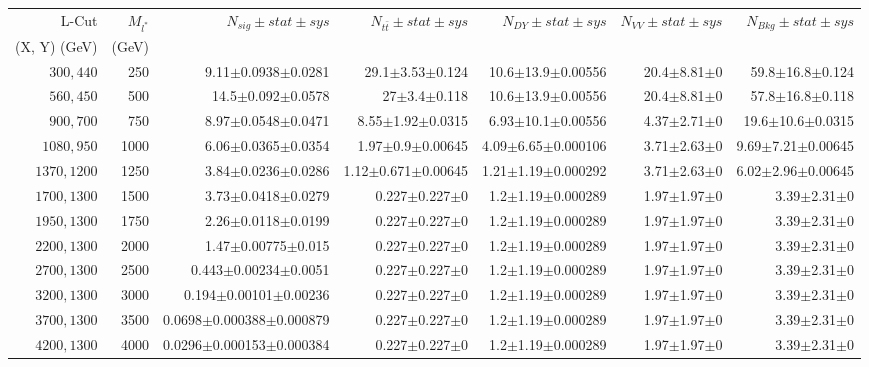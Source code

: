 \documentclass[]{article}
\begin{document}
\begin{table}
\begin{center}
\scriptsize{
\begin{tabular}{ |r|r|r|r|r|r|r|}
\hline 
L-Cut & $M_{l^*}$ & $N_{sig}\pm stat \pm sys $ &$N_{t\bar{t}}\pm stat \pm sys $ & $N_{DY}\pm stat \pm sys $ & $N_{VV}\pm stat \pm sys $ &$N_{Bkg}\pm stat \pm sys$\\
 (X, Y) (GeV) & (GeV) & && &&\\
\hline 
$300, 440$ & 250 & 9.11$\pm$0.0938$\pm$0.0281 & 29.1$\pm$3.53$\pm$0.124 & 10.6$\pm$13.9$\pm$0.00556 & 20.4$\pm$8.81$\pm$0 & 59.8$\pm$16.8$\pm$0.124 \\
$560, 450$ & 500 & 14.5$\pm$0.092$\pm$0.0578 & 27$\pm$3.4$\pm$0.118 & 10.6$\pm$13.9$\pm$0.00556 & 20.4$\pm$8.81$\pm$0 & 57.8$\pm$16.8$\pm$0.118 \\
$900, 700$ & 750 & 8.97$\pm$0.0548$\pm$0.0471 & 8.55$\pm$1.92$\pm$0.0315 & 6.93$\pm$10.1$\pm$0.00556 & 4.37$\pm$2.71$\pm$0 & 19.6$\pm$10.6$\pm$0.0315 \\
$1080,950$ & 1000 & 6.06$\pm$0.0365$\pm$0.0354 & 1.97$\pm$0.9$\pm$0.00645 & 4.09$\pm$6.65$\pm$0.000106 & 3.71$\pm$2.63$\pm$0 & 9.69$\pm$7.21$\pm$0.00645 \\
$1370,1200$ & 1250 & 3.84$\pm$0.0236$\pm$0.0286 & 1.12$\pm$0.671$\pm$0.00645 & 1.21$\pm$1.19$\pm$0.000292 & 3.71$\pm$2.63$\pm$0 & 6.02$\pm$2.96$\pm$0.00645 \\
$1700,1300$ & 1500 & 3.73$\pm$0.0418$\pm$0.0279 & 0.227$\pm$0.227$\pm$0 & 1.2$\pm$1.19$\pm$0.000289 & 1.97$\pm$1.97$\pm$0 & 3.39$\pm$2.31$\pm$0 \\
$1950,1300$ & 1750 & 2.26$\pm$0.0118$\pm$0.0199 & 0.227$\pm$0.227$\pm$0 & 1.2$\pm$1.19$\pm$0.000289 & 1.97$\pm$1.97$\pm$0 & 3.39$\pm$2.31$\pm$0 \\
$2200,1300$ & 2000 & 1.47$\pm$0.00775$\pm$0.015 & 0.227$\pm$0.227$\pm$0 & 1.2$\pm$1.19$\pm$0.000289 & 1.97$\pm$1.97$\pm$0 & 3.39$\pm$2.31$\pm$0 \\
$2700,1300$ & 2500 & 0.443$\pm$0.00234$\pm$0.0051 & 0.227$\pm$0.227$\pm$0 & 1.2$\pm$1.19$\pm$0.000289 & 1.97$\pm$1.97$\pm$0 & 3.39$\pm$2.31$\pm$0 \\
$3200,1300$ & 3000 & 0.194$\pm$0.00101$\pm$0.00236 & 0.227$\pm$0.227$\pm$0 & 1.2$\pm$1.19$\pm$0.000289 & 1.97$\pm$1.97$\pm$0 & 3.39$\pm$2.31$\pm$0 \\
$3700,1300$ & 3500 & 0.0698$\pm$0.000388$\pm$0.000879 & 0.227$\pm$0.227$\pm$0 & 1.2$\pm$1.19$\pm$0.000289 & 1.97$\pm$1.97$\pm$0 & 3.39$\pm$2.31$\pm$0 \\
$4200,1300$ & 4000 & 0.0296$\pm$0.000153$\pm$0.000384 & 0.227$\pm$0.227$\pm$0 & 1.2$\pm$1.19$\pm$0.000289 & 1.97$\pm$1.97$\pm$0 & 3.39$\pm$2.31$\pm$0 \\

\end{tabular}}
\end{center}
\end{table}
\end{document}
